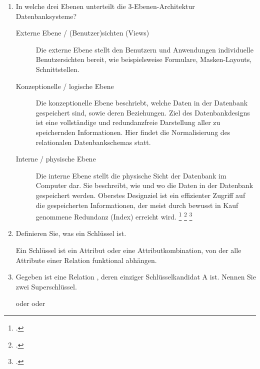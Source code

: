\documentclass{bschlangaul-aufgabe}
\begin{document}
\begin{enumerate}
\item In welche drei Ebenen unterteilt die 3-Ebenen-Architektur
Datenbanksysteme?

\begin{bAntwort}

\begin{description}
\item[Externe Ebene / (Benutzer)sichten (Views)]

Die externe Ebene stellt den Benutzern und Anwendungen individuelle
Benutzersichten bereit, wie beispielsweise Formulare, Masken-Layouts,
Schnittstellen.

\item[Konzeptionelle / logische Ebene]

Die konzeptionelle Ebene beschriebt, welche Daten in der Datenbank
gespeichert sind, sowie deren Beziehungen. Ziel des Datenbankdesigns ist
eine vollständige und redundanzfreie Darstellung aller zu speichernden
Informationen. Hier findet die Normalisierung des relationalen
Datenbankschemas statt.

\item[Interne / physische Ebene]

Die interne Ebene stellt die physische Sicht der Datenbank im Computer
dar. Sie beschreibt, wie und wo die Daten in der Datenbank gespeichert
werden. Oberstes Designziel ist ein effizienter Zugriff auf die
gespeicherten Informationen, der meist durch bewusst in Kauf genommene
Redundanz (\zB Index) erreicht wird.
\footcite[Seite 443, 13.1.3 Architektur eines Datenbanksystems]{schneider}
\footcite[Seite 23, 1.2 Datenabstraktion]{kemper}
\footcite[Seite 20]{db:fs:3}
\end{description}
\end{bAntwort}


\item Definieren Sie, was ein Schlüssel ist.

\begin{bAntwort}
Ein Schlüssel ist ein Attribut oder eine Attributkombination, von der
alle Attribute einer Relation funktional abhängen.
\end{bAntwort}


\item Gegeben ist eine Relation , deren einziger
Schlüsselkandidat A ist. Nennen Sie zwei Superschlüssel.

\begin{bAntwort}
 oder  oder 
\end{bAntwort}


\end{enumerate}
\end{document}

